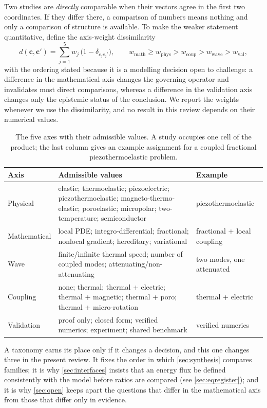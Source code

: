 Two studies are \emph{directly} comparable when their vectors agree in the first two coordinates. If they
differ there, a comparison of numbers means nothing and only a comparison of structure is available. To
make the weaker statement quantitative, define the axis-weight dissimilarity
\begin{equation}\label{eq:taxdissim}
d(\mathbf{c},\mathbf{c}')=\sum_{j=1}^{5} w_j\,\bigl(1-\delta_{c_j c_j'}\bigr),
\qquad
w_{\mathrm{math}}\ge w_{\mathrm{phys}}>w_{\mathrm{coup}}>w_{\mathrm{wave}}>w_{\mathrm{val}} ,
\end{equation}
with the ordering stated because it is a modelling decision open to challenge: a difference in the
mathematical axis changes the governing operator and invalidates most direct comparisons, whereas a
difference in the validation axis changes only the epistemic status of the conclusion. We report the
weights whenever we use the dissimilarity, and no result in this review depends on their numerical values.

\begin{table}[H]\centering\small
\caption{The five axes with their admissible values. A study occupies one cell of the product; the last
column gives an example assignment for a coupled fractional piezothermoelastic problem.}
\label{tab:taxonomy-axes}
\begin{tabularx}{\textwidth}{@{}p{1.6cm}Y Y@{}}
\toprule
\textbf{Axis} & \textbf{Admissible values} & \textbf{Example} \\
\midrule
Physical & elastic; thermoelastic; piezoelectric; piezothermoelastic; magneto-thermo-elastic; poroelastic;
  micropolar; two-temperature; semiconductor & piezothermoelastic \\
Mathematical & local PDE; integro-differential; fractional; nonlocal gradient; hereditary; variational &
  fractional + local coupling \\
Wave & finite/infinite thermal speed; number of coupled modes; attenuating/non-attenuating &
  two modes, one attenuated \\
Coupling & none; thermal; thermal + electric; thermal + magnetic; thermal + poro; thermal + micro-rotation &
  thermal + electric \\
Validation & proof only; closed form; verified numerics; experiment; shared benchmark &
  verified numerics \\
\bottomrule
\end{tabularx}
\end{table}

A taxonomy earns its place only if it changes a decision, and this one changes three in the present review.
It fixes the order in which \cref{sec:synthesis} compares families; it is why \cref{sec:interfaces} insists
that an energy flux be defined consistently with the model before ratios are compared (see
\cref{sec:eqregister}); and it is why \cref{sec:open} keeps apart the questions that differ in the
mathematical axis from those that differ only in evidence.
